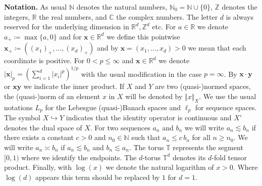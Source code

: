 \documentclass[11pt,reqno]{article}
\numberwithin{equation}{section}
\theoremstyle{definition}
\theoremstyle{plain}
\newcommand{\re}{\ensuremath{\mathbb{R}}}
\newcommand{\R}{\ensuremath{{\re}^d}}
\newcommand{\N}{\ensuremath{\mathbb{N}}}
\newcommand{\zz}{\ensuremath{\mathbb{Z}}}
\newcommand{\C}{\ensuremath{\mathbb{C}}}
\newcommand{\tor}{\ensuremath{\mathbb{T}}}
\newcommand{\bx}{\ensuremath{\mathbf x}}
\newcommand{\by}{\ensuremath{\mathbf y}}
\begin{document}
{\bf Notation.} As usual $\N$ denotes the natural numbers, $\N_0=\N\cup\{0\}$,
$\zz$ denotes the integers,
$\re$ the real numbers, and $\C$ the complex numbers. The letter $d$ is always
reserved for the underlying dimension in $\re^d, \zz^d$ etc. For $a\in \re$ we denote $a_+ \coloneqq \max\{a,0\}$ and for \(\bx \in \re^d\) we define this pointwise \( \bx_+ \coloneqq ((x_1)_+,\ldots,  (x_d)_+)\) and by $ \bx = (x_1,\ldots,x_d)>0$ we mean that each coordinate is positive.
For $0<p\leq \infty$ and $\bx\in \R$ we denote $|\bx|_p = (\sum_{i=1}^d |x_i|^p)^{1/p}$ with the
usual modification in the case $p=\infty$. By \(\bx\cdot \by \) or \(\bx \by \) we indicate the inner product. If $X$ and $Y$ are two (quasi-)normed spaces, the (quasi-)norm of an element $x$ in $X$ will be denoted by \(\Vert x\Vert_X\). We use the usual notations \(L_p\) for the Lebesgue (quasi-)Banach spaces and \(\ell_p\) for sequence spaces.
The symbol $X \hookrightarrow Y$ indicates that the
identity operator is continuous and \(X'\) denotes the dual space of \(X\). For two sequences $a_n$ and $b_n$ we will write
$a_n \lesssim b_n$ if there exists a constant $c>0$ and \(n_0 \in \N \) such that $a_n \leq c\,b_n$
for all $n \geq n_0$. We will write $a_n \asymp b_n$ if $a_n \lesssim b_n$ and $b_n
\lesssim a_n$.  
The torus \(\tor\) represents the segment \( [0,1)\) where we identify the endpoints. The $d$-torus $\tor^d$ denotes its $d$-fold tensor product. Finally, with \(\log(x)\) we denote the natural logarithm of $x>0$. Where \(\log(d)\) appears this term should be replaced by \(1\) for \(d=1\).

\end{document}
